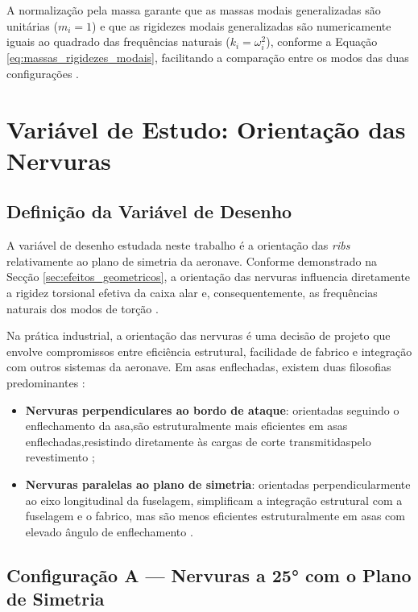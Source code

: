 \documentclass[11pt,oneside,a4paper,final]{report}
\begin{document}
A normalização pela massa garante que as massas modais generalizadas são unitárias ($m_i = 1$) e que as rigidezes modais generalizadas são numericamente iguais ao quadrado das frequências naturais ($k_i = \omega_i^2$), conforme a Equação \eqref{eq:massas_rigidezes_modais}, facilitando a comparação entre os modos das duas configurações \cite{Nastran2014, Craig2006}.

\chapter{Variável de Estudo: Orientação das Nervuras}
\label{chap:variavel}

\section{Definição da Variável de Desenho}

A variável de desenho estudada neste trabalho é a orientação das \textit{ribs} relativamente ao plano de simetria da aeronave. Conforme demonstrado na Secção \ref{sec:efeitos_geometricos}, a orientação das nervuras influencia diretamente a rigidez torsional efetiva da caixa alar e, consequentemente, as frequências naturais dos modos de torção \cite{Niu1988, Megson2012}.

Na prática industrial, a orientação das nervuras é uma decisão de projeto que envolve compromissos entre eficiência estrutural, facilidade de fabrico e integração com outros sistemas da aeronave. Em asas enflechadas, existem duas filosofias predominantes \cite{Raymer2018, Niu1988}:

\begin{itemize}
    \item \textbf{Nervuras perpendiculares ao bordo de ataque}: orientadas seguindo o enflechamento da asa,são estruturalmente mais eficientes em asas enflechadas,resistindo diretamente às cargas de corte transmitidaspelo revestimento \cite{Megson2012};

    \item \textbf{Nervuras paralelas ao plano de simetria}: orientadas perpendicularmente ao eixo longitudinal da fuselagem, simplificam a integração estrutural com a fuselagem e o fabrico, mas são menos eficientes estruturalmente em asas com elevado ângulo de enflechamento \cite{Niu1988}.
\end{itemize}

\section{Configuração A --- Nervuras a 25° com o Plano 
de Simetria}
\end{document}
